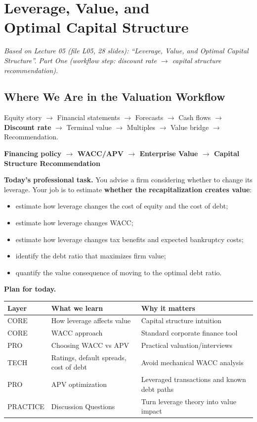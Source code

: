 \chapter[Leverage, Value, and Optimal Capital Structure]{Leverage, Value, and\\Optimal Capital Structure}\label{ch:capstr}

\emph{Based on Lecture 05 (file L05, 28 slides): ``Leverage, Value, and Optimal Capital Structure''. Part One (workflow step: discount rate $\to$ capital structure recommendation).}

\section{Where We Are in the Valuation Workflow}

Equity story $\to$ Financial statements $\to$ Forecasts $\to$ Cash flows $\to$ \textbf{Discount rate} $\to$ Terminal value $\to$ Multiples $\to$ Value bridge $\to$ Recommendation.
\begin{keybox}[Today]
\textbf{Financing policy $\longrightarrow$ WACC/APV $\longrightarrow$ Enterprise Value $\longrightarrow$ Capital Structure Recommendation}
\end{keybox}

\textbf{Today's professional task.} You advise a firm considering whether to change its leverage. Your job is to estimate \textbf{whether the recapitalization creates value}:
\begin{itemize}
  \item estimate how leverage changes the cost of equity and the cost of debt;
  \item estimate how leverage changes WACC;
  \item estimate how leverage changes tax benefits and expected bankruptcy costs;
  \item identify the debt ratio that maximizes firm value;
  \item quantify the value consequence of moving to the optimal debt ratio.
\end{itemize}

\textbf{Plan for today.}
\begin{center}
\small
\begin{tabularx}{\textwidth}{@{}lXX@{}}
\toprule
\textbf{Layer} & \textbf{What we learn} & \textbf{Why it matters}\\
\midrule
CORE & How leverage affects value & Capital structure intuition\\
CORE & WACC approach & Standard corporate finance tool\\
PRO & Choosing WACC vs APV & Practical valuation/interviews\\
TECH & Ratings, default spreads, cost of debt & Avoid mechanical WACC analysis\\
PRO & APV optimization & Leveraged transactions and known debt paths\\
PRACTICE & Discussion Questions & Turn leverage theory into value impact\\
\bottomrule
\end{tabularx}
\end{center}

